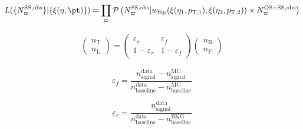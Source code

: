 \documentclass{outhesis}
\begin{document}
\begin{equation}
 L(\{N^\text{SS,obs}_\varpi\}|\{\xi(\eta,\pt)\}) 
= 
 \prod_{\varpi} \mathcal P\left(N^\text{SS,obs}_\varpi|w_\text{flip}(\xi(\eta_1,p_{\mathrm{T},1}),\xi(\eta_2,p_{\mathrm{T},2}))\times N^\text{OS+SS,obs}_\varpi\right)
\label{eqn:chargeflip_likelihood}
\end{equation}


\begin{align}
\begin{pmatrix}n_\text{T}\\n_\text{L}\end{pmatrix} 
= \begin{pmatrix}\varepsilon_r & \varepsilon_f\\ 1-\varepsilon_r & 1-\varepsilon_f\end{pmatrix}
\begin{pmatrix}n_\text{R}\\n_\text{F}\end{pmatrix}
\label{eqn:matrix_method}
\end{align}




\[
\varepsilon_f=\frac{n_\text{signal}^\text{data} - n_\text{signal}^\text{MC}}{n_\text{baseline}^\text{data} - n_\text{baseline}^\text{MC}}
\]


\[
\varepsilon_r=\frac{n_\text{signal}^\text{data}}{n_\text{baseline}^\text{data} - n_\text{baseline}^\text{BKG}}
\]




\begin{table}[htb!]
\def\arraystretch{1.15}
\def\arraystretch{1.15}
\centering
{}

\caption{Electron fake rate measured in data and the associated statistical uncertainty. 
The systematic uncertainty originating from the subtraction of ``backgrounds'' with only prompt leptons is also displayed. }
\label{table:fake_rates_electron}
\end{table}
\end{document}
